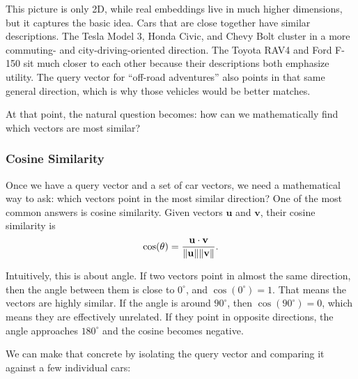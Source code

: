 \documentclass[12pt]{article}
\begin{document}
This picture is only 2D, while real embeddings live in much higher
dimensions, but it captures the basic idea. Cars that are close together
have similar descriptions. The Tesla Model 3, Honda Civic, and Chevy Bolt
cluster in a more commuting- and city-driving-oriented direction. The
Toyota RAV4 and Ford F-150 sit much closer to each other because their
descriptions both emphasize utility. The query vector for
``off-road adventures'' also points in that same general direction, which
is why those vehicles would be better matches.

At that point, the natural question becomes: how can we mathematically
find which vectors are most similar?

\subsubsection{Cosine Similarity}

Once we have a query vector and a set of car vectors, we need a
mathematical way to ask: which vectors point in the most similar
direction? One of the most common answers is cosine similarity. Given
vectors $\mathbf{u}$ and $\mathbf{v}$, their cosine similarity is
\[
\cos(\theta) =
\frac{\mathbf{u} \cdot \mathbf{v}}{\norm{\mathbf{u}} \norm{\mathbf{v}}}.
\]

Intuitively, this is about angle. If two vectors point in almost the same
direction, then the angle between them is close to $0^\circ$, and
$\cos(0^\circ) = 1$. That means the vectors are highly similar. If the
angle is around $90^\circ$, then $\cos(90^\circ) = 0$, which means they
are effectively unrelated. If they point in opposite directions, the angle
approaches $180^\circ$ and the cosine becomes negative.

We can make that concrete by isolating the query vector and comparing it
against a few individual cars:
\end{document}

